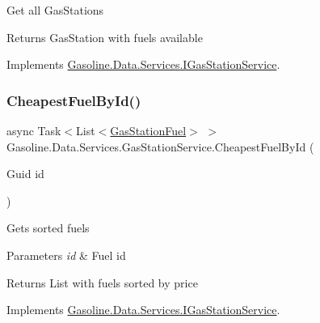 Get all Gas\+Stations 

\begin{DoxyReturn}{Returns}
Gas\+Station with fuels available
\end{DoxyReturn}


Implements \mbox{\hyperlink{interface_gasoline_1_1_data_1_1_services_1_1_i_gas_station_service_a22a21285a89cfffb01dfe3bedffa63f5}{Gasoline.\+Data.\+Services.\+I\+Gas\+Station\+Service}}.

\mbox{\label{class_gasoline_1_1_data_1_1_services_1_1_gas_station_service_a5f5ecf08135560403c4f08126ff8138a}} 
\subsubsection{\texorpdfstring{CheapestFuelById()}{CheapestFuelById()}}
{\footnotesize\ttfamily async Task$<$List$<$\mbox{\hyperlink{class_gasoline_1_1_data_1_1_models_1_1_gas_station_fuel}{Gas\+Station\+Fuel}}$>$ $>$ Gasoline.\+Data.\+Services.\+Gas\+Station\+Service.\+Cheapest\+Fuel\+By\+Id (\begin{DoxyParamCaption}\item[{Guid}]{id }\end{DoxyParamCaption})}



Gets sorted fuels 


\begin{DoxyParams}{Parameters}
{\em id} & Fuel id\\
\hline
\end{DoxyParams}
\begin{DoxyReturn}{Returns}
List with fuels sorted by price
\end{DoxyReturn}


Implements \mbox{\hyperlink{interface_gasoline_1_1_data_1_1_services_1_1_i_gas_station_service_ab8df09742ef4c7f1935743ca59b71824}{Gasoline.\+Data.\+Services.\+I\+Gas\+Station\+Service}}.

\mbox{\label{class_gasoline_1_1_data_1_1_services_1_1_gas_station_service_ade4d74ba7e340358a006867f2abe4232}} 
